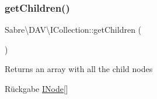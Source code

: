 \mbox{\label{interface_sabre_1_1_d_a_v_1_1_i_collection_a5344a6890e49fd7a81bb0e38b4c6d0be}} 
\subsubsection{\texorpdfstring{get\+Children()}{getChildren()}}
{\footnotesize\ttfamily Sabre\textbackslash{}\+D\+A\+V\textbackslash{}\+I\+Collection\+::get\+Children (\begin{DoxyParamCaption}{ }\end{DoxyParamCaption})}

Returns an array with all the child nodes

\begin{DoxyReturn}{Rückgabe}
\mbox{\hyperlink{interface_sabre_1_1_d_a_v_1_1_i_node}{I\+Node}}\mbox{[}\mbox{]} 
\end{DoxyReturn}


